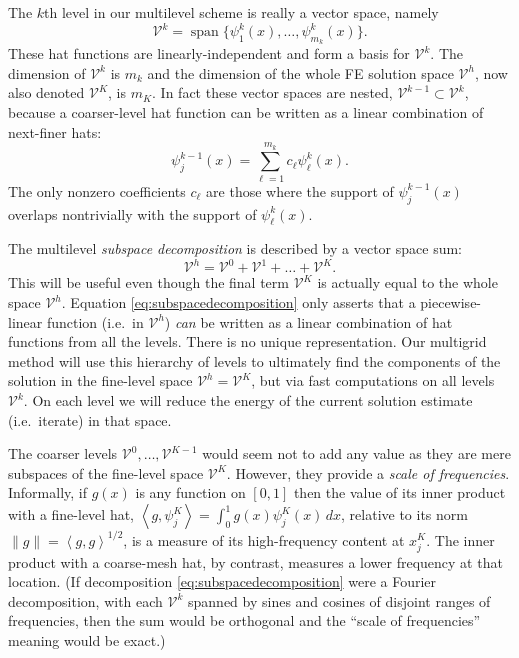 \documentclass[letterpaper,final,12pt,reqno]{amsart}
\newcommand{\ip}[2]{\left<#1,#2\right>}
\begin{document}
The $k$th level in our multilevel scheme is really a vector space, namely
\begin{equation}
  \mathcal{V}^k = \operatorname{span}\{\psi_1^k(x),\dots,\psi_{m_k}^k(x)\}.  \label{eq:definevk}
\end{equation}
These hat functions are linearly-independent and form a basis for $\mathcal{V}^k$.  The dimension of $\mathcal{V}^k$ is $m_k$ and the dimension of the whole FE solution space $\mathcal{V}^h$, now also denoted $\mathcal{V}^K$, is $m_K$.  In fact these vector spaces are nested, $\mathcal{V}^{k-1} \subset \mathcal{V}^k$, because a coarser-level hat function can be written as a linear combination of next-finer hats:
\begin{equation}
   \psi_j^{k-1}(x) = \sum_{\ell=1}^{m_k} c_\ell \psi_\ell^k(x). \label{eq:hatcombination}
\end{equation}
The only nonzero coefficients $c_\ell$ are those where the support of $\psi_j^{k-1}(x)$ overlaps nontrivially with the support of $\psi_\ell^k(x)$.

The multilevel \emph{subspace decomposition} is described by a vector space sum:
\begin{equation}
  \mathcal{V}^h = \mathcal{V}^0 + \mathcal{V}^1 + \dots + \mathcal{V}^K. \label{eq:subspacedecomposition}
\end{equation}
This will be useful even though the final term $\mathcal{V}^K$ is actually equal to the whole space $\mathcal{V}^h$.  Equation \eqref{eq:subspacedecomposition} only asserts that a piecewise-linear function (i.e.~in $\mathcal{V}^h$) \emph{can} be written as a linear combination of hat functions from all the levels.  There is no unique representation.  Our multigrid method will use this hierarchy of levels to ultimately find the components of the solution in the fine-level space $\mathcal{V}^h=\mathcal{V}^K$, but via fast computations on all levels $\mathcal{V}^k$.  On each level we will reduce the energy of the current solution estimate (i.e.~iterate) in that space.

The coarser levels $\mathcal{V}^0,\dots,\mathcal{V}^{K-1}$ would seem not to add any value as they are mere subspaces of the fine-level space $\mathcal{V}^K$.  However, they provide a \emph{scale of frequencies}.  Informally, if $g(x)$ is any function on $[0,1]$ then the value of its inner product with a fine-level hat, $\ip{g}{\psi_j^K} = \int_0^1 g(x) \psi_j^K(x)\,dx$, relative to its norm $\|g\| = \ip{g}{g}^{1/2}$, is a measure of its high-frequency content at $x_j^K$.  The inner product with a coarse-mesh hat, by contrast, measures a lower frequency at that location.  (If decomposition \eqref{eq:subspacedecomposition} were a Fourier decomposition, with each $\mathcal{V}^k$ spanned by sines and cosines of disjoint ranges of frequencies, then the sum would be orthogonal and the ``scale of frequencies'' meaning would be exact.)
\end{document}
